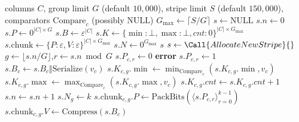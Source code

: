 \begin{algorithmic}[1]
  \Require columns $C$, group limit $G$ (default $10{,}000$), stripe limit $S$
    (default $150{,}000$), comparators $\mathrm{Compare}_c$ (possibly
    $\mathrm{NULL}$)
  \State $G_{\max}\gets\lceil S/G\rceil$
  \State $s\gets\mathrm{NULL}$ 
  \Statex
    \State $s.n\gets 0$ 
    \State $s.P\gets 0^{|C|\times G}$
    \State $s.B\gets\varepsilon^{|C|}$
    \State $s.K\gets\{\min:\bot,\max:\bot,\mathit{cnt}:0\}^{|C|\times G_{\max}}$
    \State $s.\mathrm{chunk}\gets\{P:\varepsilon,V:\varepsilon\}^{|C|\times G_{\max}}$
    \State $s.N\gets 0^{G_{\max}}$
    \State \Return $s$
  \EndProcedure
  \Statex
      \State {}
    \EndIf
      \State $s\gets\Call{AllocateNewStripe}{}$
    \EndIf
    \State $g\gets\lfloor s.n/G\rfloor$,\quad $r\gets s.n\bmod G$
        \State $s.P_{c,r}\gets 0$
      \Else
          \State \textbf{error}
        \EndIf
        \State $s.P_{c,r}\gets 1$
        \State $s.B_c\gets s.B_c\Vert\mathrm{Serialize}(v_c)$
          \State $s.K_{c,g}.\min\gets\min_{\mathrm{Compare}_c}(s.K_{c,g}.\min,v_c)$
          \State $s.K_{c,g}.\max\gets\max_{\mathrm{Compare}_c}(s.K_{c,g}.\max,v_c)$
        \EndIf
      \EndIf
      \State $s.K_{c,g}.\mathit{cnt}\gets s.K_{c,g}.\mathit{cnt}+1$
    \EndFor
      \State {}
    \EndIf
    \State $s.n\gets s.n+1$
      \State {}
    \EndIf
  \EndProcedure
  \Statex
    \State $s.N_g\gets k$
      \State $s.\mathrm{chunk}_{c,g}.P\gets
        \mathrm{PackBits}(\langle s.P_{c,r}\rangle_{r=0}^{k-1})$
    \EndFor
      \State $s.\mathrm{chunk}_{c,g}.V\gets\mathrm{Compress}(s.B_c)$

\end{algorithmic}

